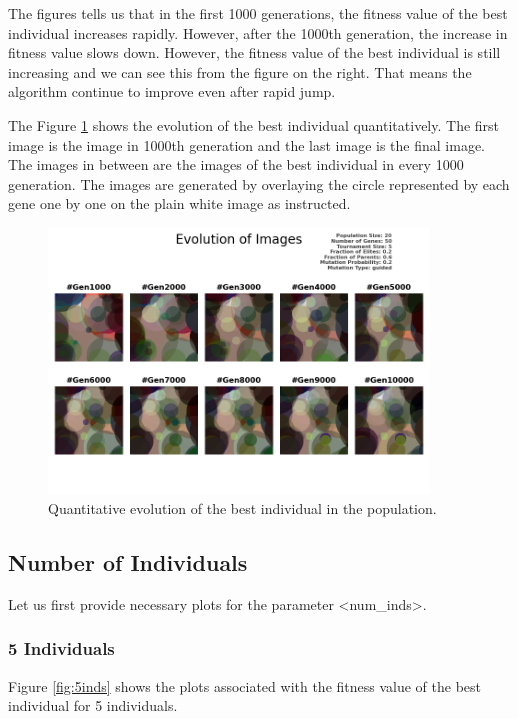 \documentclass{assignment}
\begin{document}
The figures tells us that in the first 1000 generations, the fitness value of the best individual increases rapidly. However, after the 1000th generation, the increase in fitness value slows down. However, the fitness value of the best individual is still increasing and we can see this from the figure on the right. That means the algorithm continue to improve even after rapid jump.

The Figure \ref{fig:default_image} shows the evolution of the best individual quantitatively. The first image is the image in 1000th generation and the last image is the final image. The images in between are the images of the best individual in every 1000 generation. The images are generated by overlaying the circle represented by each gene one by one on the plain white image as instructed.


\begin{figure}[!htb]
    \centering
    \includegraphics[width=0.9\textwidth]{figures/images_output_20_50_5_0.2_0.6_0.2_guided.png}
    \caption{Quantitative evolution of the best individual in the population.}
    \label{fig:default_image}
\end{figure}

\subsection{Number of Individuals}
Let us first provide necessary plots for the parameter \textless{}num\_inds\textgreater{}. 
\subsubsection{5 Individuals}
Figure \ref{fig:5inds} shows the plots associated with the fitness value of the best individual for 5 individuals.
\end{document}
